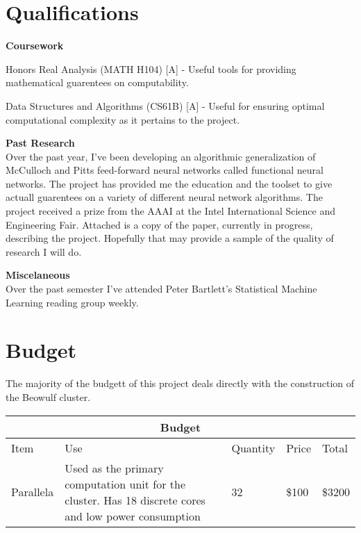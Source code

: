 \documentclass[letter]{article}
\newenvironment{menumerate}{%
  \edef\backupindent{\the\parindent}%
  \enumerate%
  \setlength{\parindent}{\backupindent}%
}{\endenumerate}
\begin{document}
\section{Qualifications}
\textbf{Coursework}
\begin{menumerate}
\item Honors Real Analysis (MATH H104) [A] - Useful tools for providing mathematical guarentees on computability.
\item Data Structures and Algorithms (CS61B) [A] - Useful for ensuring optimal computational complexity as it pertains to the project.
\end{menumerate}


\textbf{Past Research} \\
Over the past year, I've been developing an algorithmic generalization of McCulloch and Pitts feed-forward neural networks
called functional neural networks. The project has provided me the education and the toolset to give actuall guarentees on 
a variety of different neural network algorithms. The project received a prize from the AAAI at the Intel International Science and Engineering Fair.
Attached is a copy of the paper, currently in progress, describing the project. Hopefully that may provide a sample of the quality
of research I will do.

\textbf{Miscelaneous} \\
Over the past semester I've attended Peter Bartlett's Statistical Machine Learning reading group weekly.


\section{Budget}
The majority of the budgett of this project deals directly with the construction of the Beowulf cluster.


\vspace{7mm}
\centering
\begin{tabular}{ |p{2cm}|p{6cm}|p{1.5cm}|p{1cm}| p{1.5cm}|
 }
 \hline
 \multicolumn{5}{|c|}{Budget} \\
 \hline
Item& Use& Quantity&Price & Total\\
 \hline
  Parallela & Used as the primary computation unit for the cluster.  Has 18 discrete cores and low power
  consumption & 32 & \$100  & \$3200\\

 \hline
\end{tabular}
\end{document}
